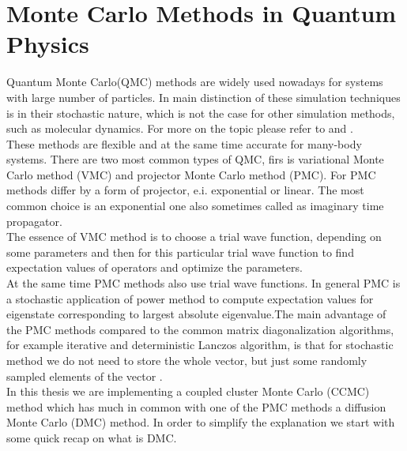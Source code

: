 \documentclass[twoside,english]{uiofysmaster}
\theoremstyle{definition}
\begin{document}
\chapter{Monte Carlo Methods in Quantum Physics}
Quantum Monte Carlo(QMC) methods are widely used nowadays for systems with large number of particles. In main distinction of these simulation techniques is in their stochastic nature, which is not the case for other simulation methods, such as molecular dynamics. For more on the topic please refer to \cite{hammondMonteCarloMethods1994} and \cite{kalosMonteCarloMethods2008}. \\
These methods are flexible and at the same time accurate for many-body systems. There are two most common types of QMC, firs is variational Monte Carlo method (VMC) and projector Monte Carlo method (PMC). For PMC methods differ by a form of projector, e.i. exponential or linear. The most common choice is an exponential one also sometimes called as imaginary time propagator.\\
The essence of VMC method is to choose a trial wave function, depending on some parameters and then for this particular trial wave function to find expectation values of operators and optimize the parameters.\\
At the same time PMC methods also use trial wave functions. In general PMC is a stochastic application of power method to compute expectation values for eigenstate corresponding to largest absolute eigenvalue.The main advantage of the PMC methods compared to the common matrix diagonalization algorithms, for example iterative and deterministic Lanczos algorithm, is that for stochastic method we do not need to store the whole vector, but just some randomly sampled elements of the vector \cite{umrigarObservationsVariationalProjector2015}. \\
In this thesis we are implementing a coupled cluster Monte Carlo (CCMC) method which has much in common with one of the PMC methods a diffusion Monte Carlo (DMC) method. In order to simplify the explanation we start with some quick recap on what is DMC.\\
\end{document}
